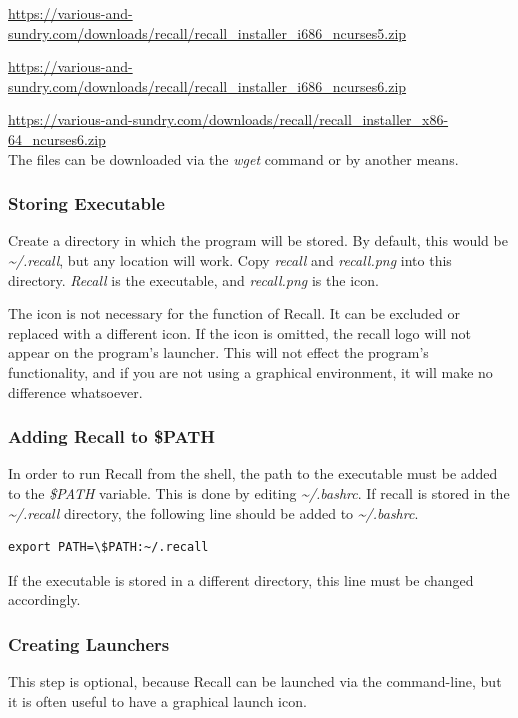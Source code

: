 \documentclass[letterpaper]{article}
\begin{document}
\href{https://various-and-sundry.com/downloads/recall/recall_installer_i686_ncurses5.zip}{https://various-and-sundry.com/downloads/recall/recall\_installer\_i686\_ncurses5.zip}

\href{https://various-and-sundry.com/downloads/recall/recall_installer_i686_ncurses6.zip}{https://various-and-sundry.com/downloads/recall/recall\_installer\_i686\_ncurses6.zip}

\href{https://various-and-sundry.com/downloads/recall/recall_installer_x86-64_ncurses6.zip}{https://various-and-sundry.com/downloads/recall/recall\_installer\_x86-64\_ncurses6.zip}\\

The files can be downloaded via the \textit{wget} command or by another means.

\subsubsection{Storing Executable}
Create a directory in which the program will be stored. By default, this would be \textit{\~{}/.recall}, but any location will work. Copy \textit{recall} and \textit{recall.png} into this directory. \textit{Recall} is the executable, and \textit{recall.png} is the icon.

The icon is not necessary for the function of Recall. It can be excluded or replaced with a different icon. If the icon is omitted, the recall logo will not appear on the program's launcher. This will not effect the program's functionality, and if you are not using a graphical environment, it will make no difference whatsoever.

\subsubsection{Adding Recall to \$PATH}
In order to run Recall from the shell, the path to the executable must be added to the \textit{\$PATH} variable. This is done by editing \textit{\~{}/.bashrc}. If recall is stored in the \textit{\~{}/.recall} directory, the following line should be added to \textit{\~{}/.bashrc}.
\begin{verbatim}
export PATH=\$PATH:~/.recall
\end{verbatim}
If the executable is stored in a different directory, this line must be changed accordingly.

\subsubsection{Creating Launchers}
This step is optional, because Recall can be launched via the command-line, but it is often useful to have a graphical launch icon.
\end{document}

